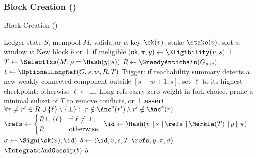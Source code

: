 \subsubsection{Block Creation (\ProjBase)}
\begin{algorithm}[htbp!]
\caption{Block Creation (\ProjBase)}
\label{alg:block-creation}
\begin{algorithmic}[1]
\Require Ledger state $S$, mempool $M$, validator $v$, key $\sk(v)$, stake $\stake(v)$, slot $s$, window $w$
\Ensure New block $b$ or $\bot$ if ineligible
\State $(\mathsf{ok}, \pi, y) \gets \Eligibility(v,s)$
 \Return $\bot$ \EndIf
\State $T \gets \SelectTxs(M; \rho = \Hash(y\|s))$
\State $R \gets \GreedyAntichain(G_{s,w})$
\State $\ell \gets \OptionalLongRef(G, s, w, R, T)$
Trigger: if reachability summary detects a new weakly-connected component outside $[s-w+1,s]$, set $\ell$ to its highest checkpoint; otherwise $\ell\gets\bot$. Long-refs carry zero weight in fork-choice.
  \State prune a minimal subset of $T$ to remove conflicts, or \Return $\bot$
\EndIf
\State \textbf{assert} $\forall r\neq r'\in R\cup\{\ell\}\setminus\{\bot\}:\ r\notin \Anc^*(r')\land r'\notin \Anc^*(r)$%
\State $\refs \gets 
\begin{cases}
R \cup \{\ell\} & \text{if }\ell\neq\bot,\\
R & \text{otherwise.}
\end{cases}$
\State $\id \gets \Hash(v \,\|\, s \,\|\, \refs \,\|\, \Merkle(T) \,\|\, y \,\|\, \pi)$
\State $\sigma \gets \Sign(\sk(v); \id)$
\State $b \gets \langle \id, v, s, T, \refs, y, \pi, \sigma\rangle$
\State $\IntegrateAndGossip(b)$
\State \Return $b$
\end{algorithmic}
\end{algorithm}



